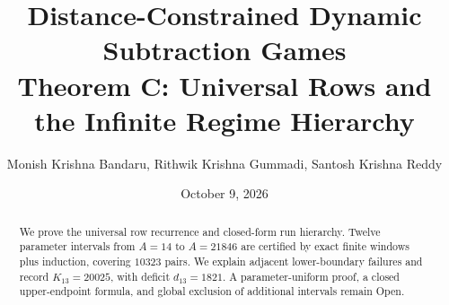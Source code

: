 \documentclass[11pt]{article}
\title{\textbf{Distance-Constrained Dynamic Subtraction Games}\\[0.4em]Theorem C: Universal Rows and the Infinite Regime Hierarchy}
\author{Monish Krishna Bandaru, Rithwik Krishna Gummadi, Santosh Krishna Reddy}
\date{October 9, 2026}
\begin{document}
\maketitle
\begin{abstract}We prove the universal row recurrence and closed-form run hierarchy. Twelve parameter intervals from $A=14$ to $A=21846$ are certified by exact finite windows plus induction, covering $10323$ pairs. We explain adjacent lower-boundary failures and record $K_{13}=20025$, with deficit $d_{13}=1821$. A parameter-uniform proof, a closed upper-endpoint formula, and global exclusion of additional intervals remain Open.\end{abstract}
\tableofcontents




\end{document}
